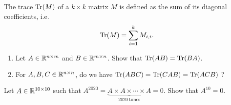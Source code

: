 \documentclass[11pt,nocut]{article}
\begin{document}
\begin{problem}[2 points]
	The trace ${{\rm Tr}}(M)$ of a $k \times k$ matrix $M$ is defined as the sum of its diagonal coefficients, i.e.
	$$
	{{\rm Tr}}(M) = \sum_{i=1}^k M_{i,i}.
	$$
	\begin{enumerate}[label=\normalfont(\textbf{\alph*})]
		\item Let $A \in \mathbb{R}^{n \times m}$ and $B \in \mathbb{R}^{m \times n}$. Show that ${{\rm Tr}}(AB) = {{\rm Tr}}(BA)$.
		\item For $A,B,C \in \mathbb{R}^{n \times n}$, do we have ${{\rm Tr}}(ABC) = {{\rm Tr}}(CAB) = {{\rm Tr}}(ACB)$ ?
	\end{enumerate}
\end{problem}

\vspace{5mm}

\begin{problem}[*]
	Let $A \in \mathbb{R}^{10 \times 10}$ such that $A^{2020} = \underbrace{A \times A \times \cdots \times A}_{2020 \ \text{times}} = 0$. Show that $A^{10} = 0$.
\end{problem}



\vspace{1cm}
\centerline{}

%
%
\end{document}
